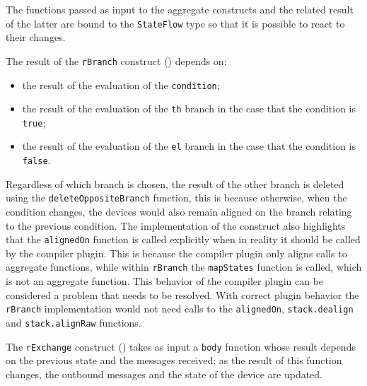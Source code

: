 The functions passed as input to the aggregate constructs and the related result of the latter are bound to the \texttt{StateFlow} type so that it is possible to react to their changes.

The result of the \texttt{rBranch} construct () depends on:
\begin{itemize}
    \item the result of the evaluation of the \texttt{condition};
    \item the result of the evaluation of the \texttt{th} branch in the case that the condition is \texttt{true};
    \item the result of the evaluation of the \texttt{el} branch in the case that the condition is \texttt{false}.
\end{itemize}

Regardless of which branch is chosen, the result of the other branch is deleted using the \texttt{deleteOppositeBranch} function, this is because otherwise, when the condition changes, the devices would also remain aligned on the branch relating to the previous condition. The implementation of the construct also highlights that the \texttt{alignedOn} function is called explicitly when in reality it should be called by the compiler plugin. This is because the compiler plugin only aligns calls to aggregate functions, while within \texttt{rBranch} the \texttt{mapStates} function is called, which is not an aggregate function. This behavior of the compiler plugin can be considered a problem that needs to be resolved. With correct plugin behavior the \texttt{rBranch} implementation would not need calls to the \texttt{alignedOn}, \texttt{stack.dealign} and \texttt{stack.alignRaw} functions.

The \texttt{rExchange} construct () takes as input a \texttt{body} function whose result depends on the previous state and the messages received; as the result of this function changes, the outbound messages and the state of the device are updated.







